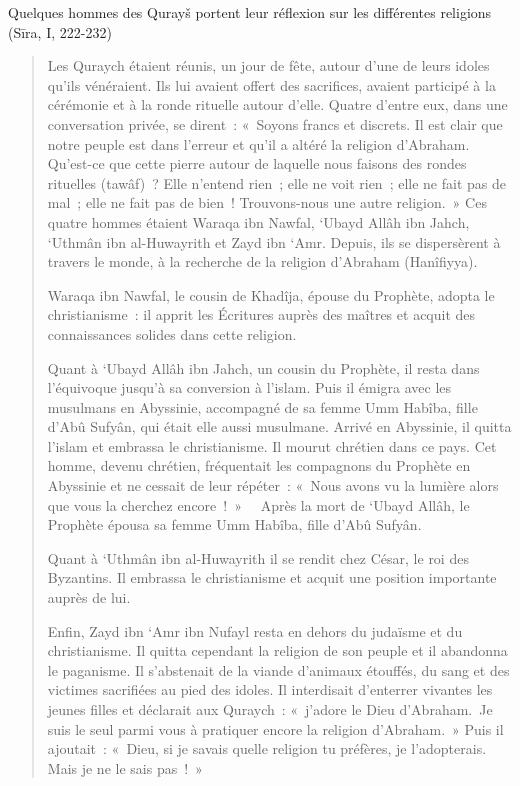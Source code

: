 Quelques hommes des Qurayš portent leur réflexion sur les différentes
religions (Sīra, I, 222-232)
\begin{quotation}
    

Les Quraych étaient réunis, un jour de fête, autour d'une de leurs
idoles qu'ils vénéraient. Ils lui avaient offert des sacrifices, avaient
participé à la cérémonie et à la ronde rituelle autour d'elle. Quatre
d'entre eux, dans une conversation privée, se dirent~: «~Soyons francs
et discrets. Il est clair que notre peuple est dans l'erreur et qu'il a
altéré la religion d'Abraham. Qu'est-ce que cette pierre autour de
laquelle nous faisons des rondes rituelles (tawâf)~? Elle n'entend
rien~; elle ne voit rien~; elle ne fait pas de mal~; elle ne fait pas de
bien~! Trouvons-nous une autre religion.~» Ces quatre hommes étaient
Waraqa ibn Nawfal, `Ubayd Allâh ibn Jahch, `Uthmân ibn al-Huwayrith et
Zayd ibn `Amr. Depuis, ils se dispersèrent à travers le monde, à la
recherche de la religion d'Abraham (Hanîfiyya).

Waraqa ibn Nawfal, le cousin de Khadîja, épouse du Prophète, adopta le
christianisme~: il apprit les Écritures auprès des maîtres et acquit des
connaissances solides dans cette religion.

Quant à `Ubayd Allâh ibn Jahch, un cousin du Prophète, il resta dans
l'équivoque jusqu'à sa conversion à l'islam. Puis il émigra avec les
musulmans en Abyssinie, accompagné de sa femme Umm Habîba, fille d'Abû
Sufyân, qui était elle aussi musulmane. Arrivé en Abyssinie, il quitta
l'islam et embrassa le christianisme. Il mourut chrétien dans ce pays.
Cet homme, devenu chrétien, fréquentait les compagnons du Prophète en
Abyssinie et ne cessait de leur répéter~: «~Nous avons vu la lumière
alors que vous la cherchez encore~!~»~~ Après la mort de `Ubayd Allâh,
le Prophète épousa sa femme Umm Habîba, fille d'Abû Sufyân.

Quant à `Uthmân ibn al-Huwayrith il se rendit chez César, le roi des
Byzantins. Il embrassa le christianisme et acquit une position
importante auprès de lui.

Enfin, Zayd ibn `Amr ibn Nufayl resta en dehors du judaïsme et du
christianisme. Il quitta cependant la religion de son peuple et il
abandonna le paganisme. Il s'abstenait de la viande d'animaux étouffés,
du sang et des victimes sacrifiées au pied des idoles. Il interdisait
d'enterrer vivantes les jeunes filles et déclarait aux Quraych~:
«~j'adore le Dieu d'Abraham.~Je suis le seul parmi vous à pratiquer
encore la religion d'Abraham.~» Puis il ajoutait~: «~Dieu, si je savais
quelle religion tu préfères, je l'adopterais. Mais je ne le sais pas~!~»


\end{quotation}
